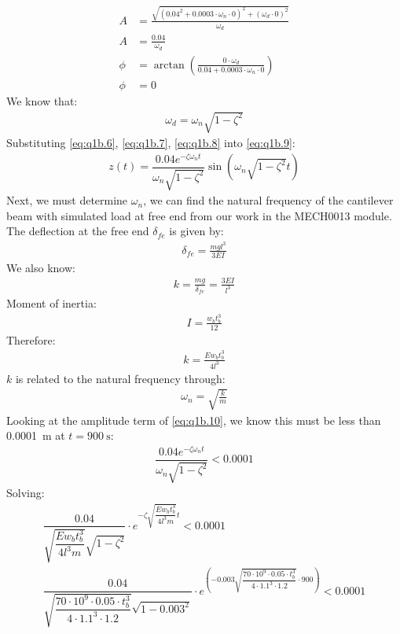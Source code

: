 \documentclass[11pt]{article}
\numberwithin{equation}{section}
\begin{document}
\begin{align}
    A    & = \frac{\sqrt{\left(0.04^2 + 0.0003 \cdot \omega_n \cdot 0 \right)^2 + \left(\omega_d \cdot 0 \right)^2}}{\omega_d} \\
    A    & = \frac{0.04}{\omega_d}\label{eq:q1b.6}                                                                             \\
    \phi & = \arctan \left(\frac{0 \cdot \omega_d}{0.04 + 0.0003 \cdot \omega_n \cdot 0}\right)                                \\
    \phi & = 0\label{eq:q1b.7}
\end{align}
We know that:
\begin{align}
    \omega_d = \omega_n \sqrt{1 - \zeta^2} \label{eq:q1b.8}
\end{align}
Substituting \ref{eq:q1b.6}, \ref{eq:q1b.7}, \ref{eq:q1b.8} into \ref{eq:q1b.9}:
\begin{align}
    z\left(t\right) = \dfrac{0.04e^{-\zeta \omega_n t}}{\omega_n \sqrt{1 - \zeta^2}} \sin\left(\omega_n \sqrt{1 - \zeta^2} t\right) \label{eq:q1b.10}
\end{align}
Next, we must determine $\omega_n$, we can find the natural frequency of the cantilever beam with simulated load at free end from our work in the MECH0013 module. The deflection at the free end $\delta_{fe}$ is given by:
\begin{gather}
    \delta_{fe} = \frac{mgl^3}{3EI}
\end{gather}
We also know:
\begin{gather}
    k = \frac{mg}{\delta_{fe}} = \frac{3EI}{l^3}
\end{gather}
Moment of inertia:
\begin{gather}
    I = \frac{w_b t_b^3}{12}
\end{gather}
Therefore:
\begin{gather}
    k = \frac{E w_b t_b^3}{4l^3}
\end{gather}
$k$ is related to the natural frequency through:
\begin{gather}
    \omega_n = \sqrt{\frac{k}{m}}
\end{gather}
Looking at the amplitude term of \ref{eq:q1b.10}, we know this must be less than \SI{0.0001}{\meter} at $t = \SI{900}{\second}$:
\begin{gather}
    \dfrac{0.04e^{-\zeta \omega_n t}}{\omega_n \sqrt{1 - \zeta^2}} < 0.0001
\end{gather}
Solving:
\begin{gather}
    \dfrac{0.04}{\sqrt{\dfrac{E w_b t_b^3}{4l^3m}} \sqrt{1 - \zeta^2}} \cdot e^{-\zeta \sqrt{\dfrac{E w_b t_b^3}{4l^3m}} t}                                                                                                                     < 0.0001 \label{eq:q1b.11} \\
    \dfrac{0.04}{\sqrt{\dfrac{70\cdot 10^9 \cdot 0.05\cdot  t_b^3}{4\cdot 1.1^3\cdot 1.2}} \sqrt{1 - 0.003^2}}\cdot  e^{\left(-0.003 \sqrt{\dfrac{70\cdot 10^9 \cdot 0.05\cdot  t_b^3}{4\cdot 1.1^3\cdot 1.2}} \cdot 900\right)}  < 0.0001
\end{gather}
\end{document}
